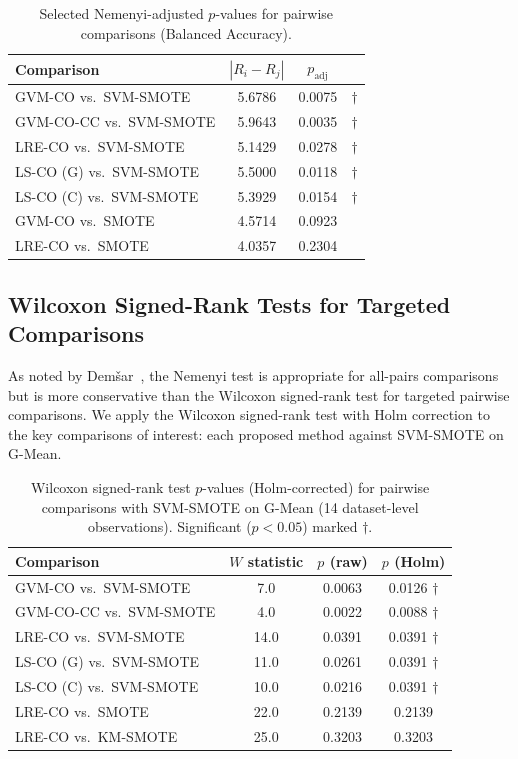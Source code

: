 \begin{table}[H]
\centering
\caption{Selected Nemenyi-adjusted $p$-values for pairwise comparisons (Balanced Accuracy).}
\label{tab:stat:nemenyi_bacc}
\small
\begin{tabular}{lccc}
\toprule
\textbf{Comparison} & \textbf{$|R_i - R_j|$} & \textbf{$p_{\mathrm{adj}}$} & \\
\midrule
GVM-CO vs.\ SVM-SMOTE    & 5.6786 & 0.0075 & $\dagger$ \\
GVM-CO-CC vs.\ SVM-SMOTE & 5.9643 & 0.0035 & $\dagger$ \\
LRE-CO vs.\ SVM-SMOTE    & 5.1429 & 0.0278 & $\dagger$ \\
LS-CO (G) vs.\ SVM-SMOTE & 5.5000 & 0.0118 & $\dagger$ \\
LS-CO (C) vs.\ SVM-SMOTE & 5.3929 & 0.0154 & $\dagger$ \\
\midrule
GVM-CO vs.\ SMOTE        & 4.5714 & 0.0923 & \\
LRE-CO vs.\ SMOTE        & 4.0357 & 0.2304 & \\
\bottomrule
\end{tabular}
\end{table}

\subsection{Wilcoxon Signed-Rank Tests for Targeted Comparisons}
\label{sec:stat:wilcoxon}

As noted by Dem\v{s}ar~\cite{demsar2006statistical}, the Nemenyi test is appropriate for all-pairs comparisons but is more conservative than the Wilcoxon signed-rank test for targeted pairwise comparisons.
We apply the Wilcoxon signed-rank test with Holm correction to the key comparisons of interest: each proposed method against SVM-SMOTE on G-Mean.

\begin{table}[H]
\centering
\caption{Wilcoxon signed-rank test $p$-values (Holm-corrected) for pairwise comparisons with SVM-SMOTE on G-Mean (14 dataset-level observations). Significant ($p < 0.05$) marked $\dagger$.}
\label{tab:stat:wilcoxon}
\begin{tabular}{lccc}
\toprule
\textbf{Comparison} & \textbf{$W$ statistic} & \textbf{$p$ (raw)} & \textbf{$p$ (Holm)} \\
\midrule
GVM-CO vs.\ SVM-SMOTE    & 7.0  & 0.0063 & 0.0126 $\dagger$ \\
GVM-CO-CC vs.\ SVM-SMOTE & 4.0  & 0.0022 & 0.0088 $\dagger$ \\
LRE-CO vs.\ SVM-SMOTE    & 14.0 & 0.0391 & 0.0391 $\dagger$ \\
LS-CO (G) vs.\ SVM-SMOTE & 11.0 & 0.0261 & 0.0391 $\dagger$ \\
LS-CO (C) vs.\ SVM-SMOTE & 10.0 & 0.0216 & 0.0391 $\dagger$ \\
\midrule
LRE-CO vs.\ SMOTE        & 22.0 & 0.2139 & 0.2139 \\
LRE-CO vs.\ KM-SMOTE     & 25.0 & 0.3203 & 0.3203 \\
\bottomrule
\end{tabular}
\end{table}

